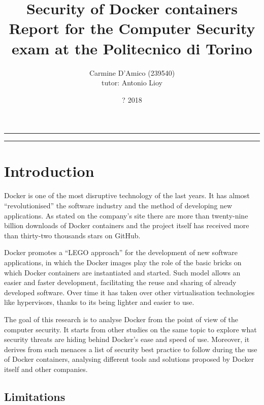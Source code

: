 \documentclass[a4paper,12pt]{article}
\begin{document}
\title{Security of Docker containers \\
{\normalsize Report for the Computer Security exam at the Politecnico di Torino}
} \author{Carmine D'Amico (239540) \\
{\normalsize tutor: Antonio Lioy} }
\date{? 2018}
\maketitle

\vfill

\rule{\textwidth}{1pt}

\tableofcontents

\rule{\textwidth}{1pt}

\vfill

\newpage

\section{Introduction}

Docker is one of the most disruptive technology of the last years. It has almost
``revolutionised'' the software industry and the method of developing new
applications. As stated on the company's site \cite{docker_numbers} there are
more than twenty-nine billion downloads of Docker containers and the project
itself has received more than thirty-two thousands stars on GitHub. \par Docker
promotes a ``LEGO approach'' for the development of new software applications,
in which the Docker images play the role of the basic bricks on which Docker
containers are instantiated and started. Such model allows an easier and faster
development, facilitating the reuse and sharing of already developed software.
Over time it has taken over other virtualisation technologies like hypervisors,
thanks to its being lighter and easier to use. \par The goal of this research is
to analyse Docker from the point of view of the computer security. It starts
from other studies on the same topic to explore what security threats
are hiding behind Docker's ease and speed of use. Moreover, it derives from such
menaces a list of security best practice to follow during the use of Docker
containers, analysing different tools and solutions proposed by Docker itself
and other companies. 

\subsection{Limitations}
\end{document}
